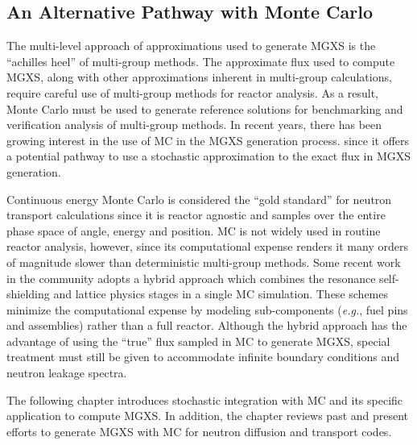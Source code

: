 \subsection{An Alternative Pathway with Monte Carlo}
\label{subsec:chap2-mgxs-lib-mc}

The multi-level approach of approximations used to generate \ac{MGXS} is the ``achilles heel'' of multi-group methods. The approximate flux used to compute \ac{MGXS}, along with other approximations inherent in multi-group calculations, require careful use of multi-group methods for reactor analysis. As a result, Monte Carlo must be used to generate reference solutions for benchmarking and verification analysis of multi-group methods. In recent years, there has been growing interest in the use of \ac{MC} in the \ac{MGXS} generation process\cite{leppanen2007serpent,fridman2011serpent,
leppanen2016overview,dorval2015diff,ilas2003monte,pounders2006stochastically,
pounders2009diffusion,pounders2015history,cho2009generation,yun2010monte,
yamamoto2012buckling,yamamoto2012diff,shim2008generation,park2010assembly,park2012generation,
herman2013improved,liuphysor2016,okumura2000validation,tohjoh2005application,
gast1981procedure,ondis2000rcp01,blomquist2002status,redmond1997multigroup,
van2006homogenized,hoogenboom2007generation,yoshioka2010multigroup, yoshioka2011multi,
cai2014condensation,nelson2014improved}. since it offers a potential pathway to use a stochastic approximation to the exact flux in \ac{MGXS} generation.

Continuous energy Monte Carlo is considered the ``gold standard'' for neutron transport calculations since it is reactor agnostic and samples over the entire phase space of angle, energy and position. \ac{MC} is not widely used in routine reactor analysis, however, since its computational expense renders it many orders of magnitude slower than deterministic multi-group methods. Some recent work in the community adopts a hybrid approach which combines the resonance self-shielding and lattice physics stages in a single \ac{MC} simulation. These schemes minimize the computational expense by modeling sub-components (\textit{e.g.}, fuel pins and assemblies) rather than a full reactor. Although the hybrid approach has the advantage of using the ``true'' flux sampled in \ac{MC} to generate \ac{MGXS}, special treatment must still be given to accommodate infinite boundary conditions and neutron leakage spectra.

The following chapter introduces stochastic integration with \ac{MC} and its specific application to compute \ac{MGXS}. In addition, the chapter reviews past and present efforts to generate \ac{MGXS} with \ac{MC} for neutron diffusion and transport codes.